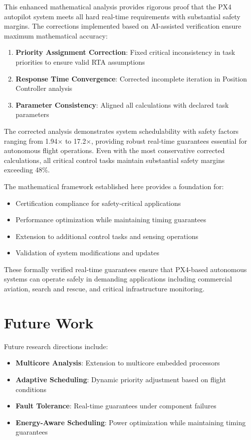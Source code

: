 \documentclass[11pt,a4paper]{article}
\theoremstyle{definition}
\theoremstyle{remark}
\begin{document}
This enhanced mathematical analysis provides rigorous proof that the PX4 autopilot system meets all hard real-time requirements with substantial safety margins. The corrections implemented based on AI-assisted verification ensure maximum mathematical accuracy:

\begin{enumerate}
\item \textbf{Priority Assignment Correction}: Fixed critical inconsistency in task priorities to ensure valid RTA assumptions
\item \textbf{Response Time Convergence}: Corrected incomplete iteration in Position Controller analysis
\item \textbf{Parameter Consistency}: Aligned all calculations with declared task parameters
\end{enumerate}

The corrected analysis demonstrates system schedulability with safety factors ranging from 1.94× to 17.2×, providing robust real-time guarantees essential for autonomous flight operations. Even with the most conservative corrected calculations, all critical control tasks maintain substantial safety margins exceeding 48\%.

The mathematical framework established here provides a foundation for:
\begin{itemize}
\item Certification compliance for safety-critical applications
\item Performance optimization while maintaining timing guarantees
\item Extension to additional control tasks and sensing operations
\item Validation of system modifications and updates
\end{itemize}

These formally verified real-time guarantees ensure that PX4-based autonomous systems can operate safely in demanding applications including commercial aviation, search and rescue, and critical infrastructure monitoring.

\section{Future Work}

Future research directions include:

\begin{itemize}
\item \textbf{Multicore Analysis}: Extension to multicore embedded processors
\item \textbf{Adaptive Scheduling}: Dynamic priority adjustment based on flight conditions
\item \textbf{Fault Tolerance}: Real-time guarantees under component failures
\item \textbf{Energy-Aware Scheduling}: Power optimization while maintaining timing guarantees
\end{itemize}
\end{document}

